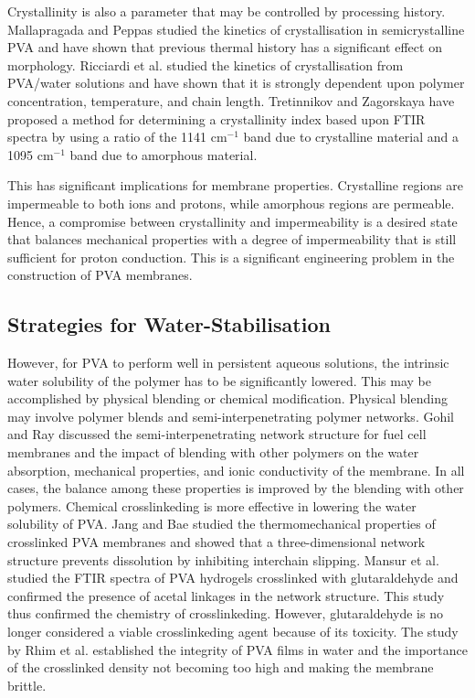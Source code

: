 \documentclass[12pt,a4paper]{report}
\begin{document}
Crystallinity is also a parameter that may be controlled by processing history. Mallapragada and Peppas studied the kinetics of crystallisation in semicrystalline PVA and have shown that previous thermal history has a significant effect on morphology.\cite{31} Ricciardi et al. studied the kinetics of crystallisation from PVA/water solutions and have shown that it is strongly dependent upon polymer concentration, temperature, and chain length.\cite{32} Tretinnikov and Zagorskaya have proposed a method for determining a crystallinity index based upon FTIR spectra by using a ratio of the 1141 cm\(^{-1}\) band due to crystalline material and a 1095 cm\(^{-1}\) band due to amorphous material\cite{33}.

This has significant implications for membrane properties. Crystalline regions are impermeable to both ions and protons, while amorphous regions are permeable. Hence, a compromise between crystallinity and impermeability is a desired state that balances mechanical properties with a degree of impermeability that is still sufficient for proton conduction. This is a significant engineering problem in the construction of PVA membranes.

\subsection{Strategies for Water-Stabilisation}
However, for PVA to perform well in persistent aqueous solutions, the intrinsic water solubility of the polymer has to be significantly lowered. This may be accomplished by physical blending or chemical modification. Physical blending may involve polymer blends and semi-interpenetrating polymer networks. Gohil and Ray discussed the semi-interpenetrating network structure for fuel cell membranes and the impact of blending with other polymers on the water absorption, mechanical properties, and ionic conductivity of the membrane\cite{34}. In all cases, the balance among these properties is improved by the blending with other polymers. Chemical crosslinkeding is more effective in lowering the water solubility of PVA. Jang and Bae studied the thermomechanical properties of crosslinked PVA membranes and showed that a three-dimensional network structure prevents dissolution by inhibiting interchain slipping\cite{35}. Mansur et al. studied the FTIR spectra of PVA hydrogels crosslinked with glutaraldehyde and confirmed the presence of acetal linkages in the network structure. This study thus confirmed the chemistry of crosslinkeding. However, glutaraldehyde is no longer considered a viable crosslinkeding agent because of its toxicity.\cite{36} The study by Rhim et al. established the integrity of PVA films in water and the importance of the crosslinked density not becoming too high and making the membrane brittle.\cite{9}
\end{document}
